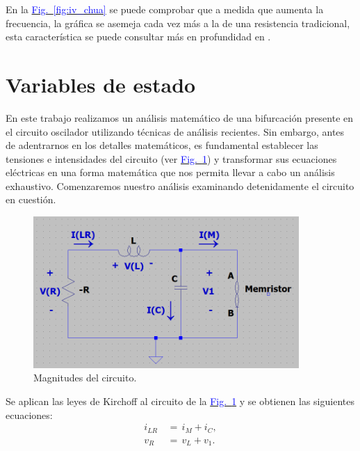 \documentclass[12pt,a4paper]{report} %
\newcommand{\fref}[1]{\hyperref[#1]{\textcolor{blue}{Fig.~\ref*{#1}}}}
\begin{document}
		\vspace{0.5cm} En la \fref{fig:iv_chua} se puede comprobar que a medida que aumenta la frecuencia, la gráfica se asemeja cada vez más a la de una resistencia tradicional, esta característica se puede consultar más en profundidad en \cite{outsiders}.
		
		
	\section{Variables de estado}
	\label{sec:23}
	
	 En este trabajo realizamos un análisis matemático de una bifurcación presente en el circuito oscilador utilizando técnicas de análisis recientes. Sin embargo, antes de adentrarnos en los detalles matemáticos, es fundamental establecer las tensiones e intensidades del circuito (ver \fref{fig:circuito}) y transformar sus ecuaciones eléctricas en una forma matemática que nos permita llevar a cabo un análisis exhaustivo. Comenzaremos nuestro análisis examinando detenidamente el circuito en cuestión.
	
	\vspace{0.5cm}\begin{figure}[h]
		\centering
		\includegraphics[width=0.9\textwidth]{circuito.png}
		\caption{Magnitudes del circuito.}
		\label{fig:circuito}
	\end{figure}\smallskip
	
	\vspace{0.5cm}\noindent Se aplican las leyes de Kirchoff al circuito de la \fref{fig:circuito} y se obtienen las siguientes ecuaciones:
	\begin{subequations}
		\label{kir}
		\begin{align}
			i_{LR}\,&=\,i_M+i_C, \label{eq:kir1}\\[5mm]
			v_R\,&=\,v_L+v_1.    \label{eq:kir2}
		\end{align}
	\end{subequations}\smallskip
	
\end{document}
